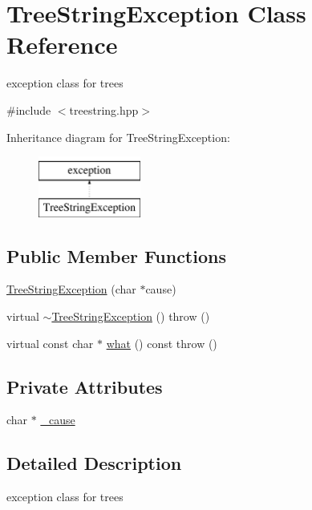 \hypertarget{class_tree_string_exception}{\section{Tree\-String\-Exception Class Reference}
\label{class_tree_string_exception}
}


exception class for trees  




{\ttfamily \#include $<$treestring.\-hpp$>$}

Inheritance diagram for Tree\-String\-Exception\-:\begin{figure}[H]
\begin{center}
\leavevmode
\includegraphics[height=2.000000cm]{class_tree_string_exception}
\end{center}
\end{figure}
\subsection*{Public Member Functions}
\begin{DoxyCompactItemize}
\item 
\hyperlink{class_tree_string_exception_a14c9647a77ce331faddb82724325419a}{Tree\-String\-Exception} (char $\ast$cause)
\item 
virtual \hyperlink{class_tree_string_exception_a4740cacfe385483aa466be7a7399ba82}{$\sim$\-Tree\-String\-Exception} ()  throw ()
\item 
virtual const char $\ast$ \hyperlink{class_tree_string_exception_a80013d6d7031026ea7ab0be964c41713}{what} () const   throw ()
\end{DoxyCompactItemize}
\subsection*{Private Attributes}
\begin{DoxyCompactItemize}
\item 
char $\ast$ \hyperlink{class_tree_string_exception_a4de00ce12f252d1d159211338b999164}{\-\_\-cause}
\end{DoxyCompactItemize}


\subsection{Detailed Description}
exception class for trees 

